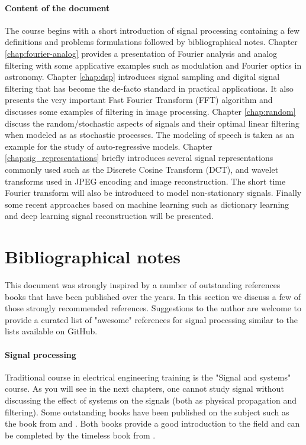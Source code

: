 \paragraph{Content of the document} The course begins with a short introduction
of signal processing containing a few definitions and problems formulations
followed by bibliographical notes. Chapter \ref{chap:fourier-analog} provides 
a presentation of Fourier analysis and analog filtering
with some applicative examples such as modulation and Fourier optics in
astronomy. Chapter \ref{chap:dsp} introduces signal sampling and digital signal filtering that has
become the de-facto standard in practical applications. It also presents the very
important Fast Fourier Transform (FFT) algorithm and discusses some examples of
filtering in image processing. Chapter \ref{chap:random} discuss the random/stochastic aspects of signals and their optimal linear
filtering when modeled as as stochastic processes. The
modeling of speech is taken as an example for the study of
auto-regressive models. Chapter \ref{chap:sig_representations} briefly
introduces  several
signal representations commonly used such as the Discrete Cosine Transform
(DCT), and wavelet transforms used in
JPEG encoding and image reconstruction. The short time Fourier transform will also be introduced to model
non-stationary signals. Finally some recent approaches based on machine learning
such as dictionary learning and deep learning signal reconstruction will be
presented.


\section{Bibliographical notes}

This document was strongly inspired by a number of outstanding references books that
have been published over the years. In this section we discuss a few of those
strongly recommended references.  Suggestions to the author are
welcome to provide a curated list of "awesome" references for signal processing
similar to the lists available on GitHub. 

\paragraph{Signal processing} Traditional course in electrical engineering training is
the "Signal and systems" course. As you will see in the next chapters, one cannot
study signal without discussing the effect of systems on the
signals (both as physical propagation and filtering).
Some outstanding books have been published on the
subject such as the book from \cite{oppenheim1997signals} and
\cite{haykin2007signals}. Both books provide a good introduction to the field
and can be completed by the timeless book from \cite{papoulis1977signal}.

